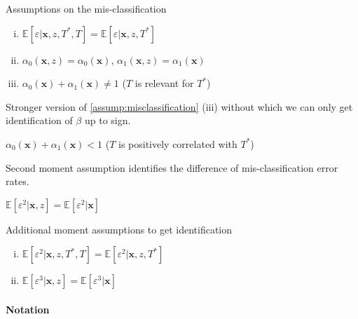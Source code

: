 \documentclass[12pt]{article}
\begin{document}
\noindent Assumptions on the mis-classification
\begin{assump} \mbox{}
  \label{assump:misclassification}
  \begin{enumerate}[(i)] 
    \item $\mathbb{E}[\varepsilon|\mathbf{x},z,T^*,T] = \mathbb{E}[\varepsilon|\mathbf{x},z, T^*]$
    \item $\alpha_0(\mathbf{x},z) = \alpha_0(\mathbf{x})$,   $\alpha_1(\mathbf{x},z) = \alpha_1(\mathbf{x})$
    \item $\alpha_0(\mathbf{x}) + \alpha_1(\mathbf{x}) \neq 1$ ($T$ is relevant for $T^*$)
  \end{enumerate}
\end{assump}

\noindent Stronger version of \ref{assump:misclassification} (iii) without which we can only get identification of $\beta$ up to sign.
\begin{assump}
  \label{assump:extent}
  $\alpha_0(\mathbf{x}) + \alpha_1(\mathbf{x}) <1$ ($T$ is positively correlated with $T^*$)
\end{assump}

\noindent Second moment assumption identifies the difference of mis-classification error rates.
\begin{assump} \mbox{}
  \label{assump:2ndMoment}
    $\mathbb{E}[\varepsilon^2|\mathbf{x},z] = \mathbb{E}[\varepsilon^2|\mathbf{x}]$ 
\end{assump}

\noindent Additional moment assumptions to get identification
\begin{assump} \mbox{}
  \label{assump:3rdMoment}
  \begin{enumerate}[(i)] 
    \item $\mathbb{E}[\varepsilon^2|\mathbf{x},z,T^*,T] = \mathbb{E}[\varepsilon^2|\mathbf{x},z, T^*]$
    \item $\mathbb{E}[\varepsilon^3|\mathbf{x},z] = \mathbb{E}[\varepsilon^3|\mathbf{x}]$
  \end{enumerate}
\end{assump}



\paragraph{Notation}
\end{document}
